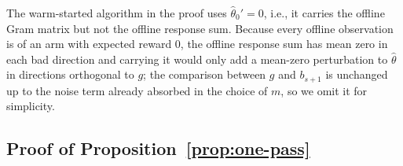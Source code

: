\documentclass[anon]{alt2027} %
\begin{document}
\begin{remark}
The warm-started algorithm in the proof uses $\widehat\theta_0'=0$, i.e., it
carries the offline Gram matrix but not the offline response sum. Because
every offline observation is of an arm with expected reward $0$, the offline
response sum has mean zero in each bad direction and carrying it would only
add a mean-zero perturbation to $\widehat\theta$ in directions orthogonal to
$g$; the comparison between $g$ and $b_{s+1}$ is unchanged up to the noise
term already absorbed in the choice of $m$, so we omit it for simplicity.
\end{remark}

\subsection{Proof of Proposition~\ref{prop:one-pass}}
\label{app:proof-one-pass}
\end{document}
